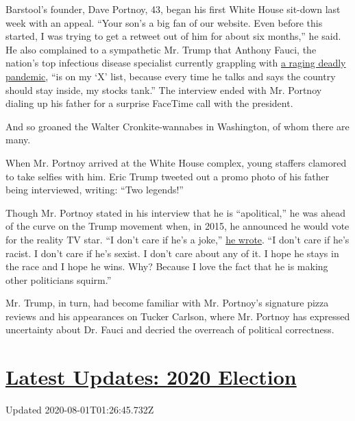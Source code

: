 Barstool's founder, Dave Portnoy, 43, began his first White House
sit-down last week with an appeal. ``Your son's a big fan of our
website. Even before this started, I was trying to get a retweet out of
him for about six months,'' he said. He also complained to a sympathetic
Mr. Trump that Anthony Fauci, the nation's top infectious disease
specialist currently grappling with
\href{https://www.nytimes3xbfgragh.onion/interactive/2020/us/coronavirus-us-cases.html}{a
raging deadly pandemic}, ``is on my `X' list, because every time he
talks and says the country should stay inside, my stocks tank.'' The
interview ended with Mr. Portnoy dialing up his father for a surprise
FaceTime call with the president.

And so groaned the Walter Cronkite-wannabes in Washington, of whom there
are many.

When Mr. Portnoy arrived at the White House complex, young staffers
clamored to take selfies with him. Eric Trump tweeted out a promo photo
of his father being interviewed, writing: ``Two legends!''

Though Mr. Portnoy stated in his interview that he is ``apolitical,'' he
was ahead of the curve on the Trump movement when, in 2015, he announced
he would vote for the reality TV star. ``I don't care if he's a joke,''
\href{https://www.barstoolsports.com/blog/351804/im-officially-voting-for-donald-trump}{he
wrote}. ``I don't care if he's racist. I don't care if he's sexist. I
don't care about any of it. I hope he stays in the race and I hope he
wins. Why? Because I love the fact that he is making other politicians
squirm.''

Mr. Trump, in turn, had become familiar with Mr. Portnoy's signature
pizza reviews and his appearances on Tucker Carlson, where Mr. Portnoy
has expressed uncertainty about Dr. Fauci and decried the overreach of
political correctness.

\hypertarget{latest-updates-2020-election}{%
\section{\texorpdfstring{\href{https://www.nytimes3xbfgragh.onion/2020/07/31/us/elections/biden-vs-trump.html?action=click\&pgtype=Article\&state=default\&region=MAIN_CONTENT_1\&context=storylines_live_updates}{Latest
Updates: 2020
Election}}{Latest Updates: 2020 Election}}\label{latest-updates-2020-election}}

Updated 2020-08-01T01:26:45.732Z

